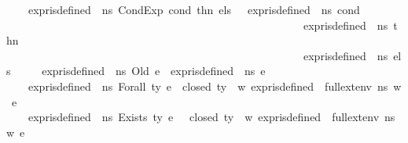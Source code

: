 \begin{isabellebody}
\ \ \ {\isacharbar}{\kern0pt}\ {\isachardoublequoteopen}expr{\isacharunderscore}{\kern0pt}is{\isacharunderscore}{\kern0pt}defined\ {\isasymLambda}\ ns\ {\isacharparenleft}{\kern0pt}CondExp\ cond\ thn\ els{\isacharparenright}{\kern0pt}\ {\isacharequal}{\kern0pt}\ {\isacharparenleft}{\kern0pt}\ {\isacharparenleft}{\kern0pt}expr{\isacharunderscore}{\kern0pt}is{\isacharunderscore}{\kern0pt}defined\ {\isasymLambda}\ ns\ cond{\isacharparenright}{\kern0pt}\ {\isasymand}\ \isanewline
\ \ \ \ \ \ \ \ \ \ \ \ \ \ \ \ \ \ \ \ \ \ \ \ \ \ \ \ \ \ \ \ \ \ \ \ \ \ \ \ \ \ \ \ \ \ \ \ \ \ \ \ \ \ {\isacharparenleft}{\kern0pt}expr{\isacharunderscore}{\kern0pt}is{\isacharunderscore}{\kern0pt}defined\ {\isasymLambda}\ ns\ thn{\isacharparenright}{\kern0pt}\ {\isasymand}\ \isanewline
\ \ \ \ \ \ \ \ \ \ \ \ \ \ \ \ \ \ \ \ \ \ \ \ \ \ \ \ \ \ \ \ \ \ \ \ \ \ \ \ \ \ \ \ \ \ \ \ \ \ \ \ \ \ {\isacharparenleft}{\kern0pt}expr{\isacharunderscore}{\kern0pt}is{\isacharunderscore}{\kern0pt}defined\ {\isasymLambda}\ ns\ els{\isacharparenright}{\kern0pt}\ {\isacharparenright}{\kern0pt}{\isachardoublequoteclose}\isanewline
\ \ \ {\isacharbar}{\kern0pt}\ {\isachardoublequoteopen}expr{\isacharunderscore}{\kern0pt}is{\isacharunderscore}{\kern0pt}defined\ {\isasymLambda}\ ns\ {\isacharparenleft}{\kern0pt}Old\ e{\isacharparenright}{\kern0pt}\ {\isacharequal}{\kern0pt}\ expr{\isacharunderscore}{\kern0pt}is{\isacharunderscore}{\kern0pt}defined\ {\isasymLambda}\ ns\ e{\isachardoublequoteclose}\isanewline
\ \ \ {\isacharbar}{\kern0pt}\ {\isachardoublequoteopen}expr{\isacharunderscore}{\kern0pt}is{\isacharunderscore}{\kern0pt}defined\ {\isasymLambda}\ ns\ {\isacharparenleft}{\kern0pt}Forall\ ty\ e{\isacharparenright}{\kern0pt}\ {\isacharequal}{\kern0pt}\ {\isacharparenleft}{\kern0pt}{\isacharparenleft}{\kern0pt}closed\ ty{\isacharparenright}{\kern0pt}\ {\isasymand}\ {\isacharparenleft}{\kern0pt}{\isasymforall}w{\isachardot}{\kern0pt}\ {\isacharparenleft}{\kern0pt}expr{\isacharunderscore}{\kern0pt}is{\isacharunderscore}{\kern0pt}defined\ {\isasymLambda}\ {\isacharparenleft}{\kern0pt}full{\isacharunderscore}{\kern0pt}ext{\isacharunderscore}{\kern0pt}env\ ns\ w{\isacharparenright}{\kern0pt}\ e{\isacharparenright}{\kern0pt}{\isacharparenright}{\kern0pt}{\isacharparenright}{\kern0pt}{\isachardoublequoteclose}\isanewline
\ \ \ {\isacharbar}{\kern0pt}\ {\isachardoublequoteopen}expr{\isacharunderscore}{\kern0pt}is{\isacharunderscore}{\kern0pt}defined\ {\isasymLambda}\ ns\ {\isacharparenleft}{\kern0pt}Exists\ ty\ e{\isacharparenright}{\kern0pt}\ {\isacharequal}{\kern0pt}\ \ {\isacharparenleft}{\kern0pt}{\isacharparenleft}{\kern0pt}closed\ ty{\isacharparenright}{\kern0pt}\ {\isasymand}\ {\isacharparenleft}{\kern0pt}{\isasymforall}w{\isachardot}{\kern0pt}\ {\isacharparenleft}{\kern0pt}expr{\isacharunderscore}{\kern0pt}is{\isacharunderscore}{\kern0pt}defined\ {\isasymLambda}\ {\isacharparenleft}{\kern0pt}full{\isacharunderscore}{\kern0pt}ext{\isacharunderscore}{\kern0pt}env\ ns\ w{\isacharparenright}{\kern0pt}\ e{\isacharparenright}{\kern0pt}{\isacharparenright}{\kern0pt}{\isacharparenright}{\kern0pt}{\isachardoublequoteclose}\isanewline

\end{isabellebody}
